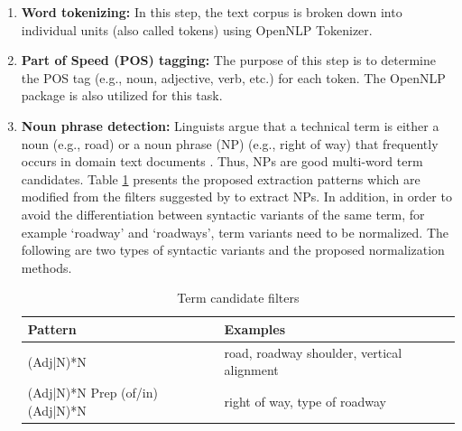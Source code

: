 \documentclass[Journal, BackFigs, DoubleSpace]{ascelike} %
\begin{document}
\begin{enumerate} [label=\roman*]
	\item \textbf{Word tokenizing:} In this step, the text corpus is broken down into individual units (also called tokens) using OpenNLP Tokenizer.
	\item \textbf{Part of Speed (POS) tagging:} The purpose of this step is to determine the POS tag (e.g., noun, adjective, verb, etc.) for each token. The OpenNLP package is also utilized for this task. %
	\item \textbf{Noun phrase detection:} Linguists argue that a technical term is either a noun (e.g., road) or a noun phrase (NP) (e.g., right of way) that frequently occurs in domain text documents \cite{justeson95}. Thus, NPs are good multi-word term candidates. Table \ref{table:term_filter} presents the proposed extraction patterns which are modified from the filters suggested by  to extract NPs. %
	In addition, in order to avoid the differentiation between syntactic variants of the same term, for example `roadway' and `roadways', term variants need to be normalized. The following are two types of syntactic variants and the proposed normalization methods.
	\begin{table} [t]
		\caption{Term candidate filters}
		\label{table:term_filter}
		\centering
		\small
		\renewcommand{\arraystretch}{1.25}
		\begin{tabular}{l l}
			\hline
			\textbf{Pattern} & \textbf{Examples}\\
			\hline
			(Adj|N)*N		& road, roadway shoulder, vertical alignment\\
			(Adj|N)*N Prep (of/in) (Adj|N)*N	&	right of way, type of roadway\\

\end{tabular}
\end{table}
\end{enumerate}
\end{document}

